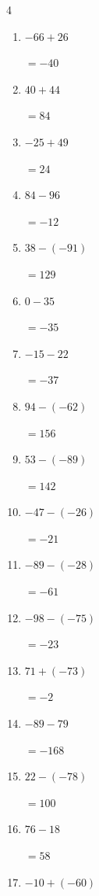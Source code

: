 \begin{multicols}{4}
\begin{enumerate}
        $=-138$

  \item $-66+26$

        $=-40$

  \item $40+44$

        $=84$

  \item $-25+49$

        $=24$

  \item $84-96$

        $=-12$

  \item $38-(-91)$

        $=129$

  \item $0-35$

        $=-35$

  \item $-15-22$

        $=-37$

  \item $94-(-62)$

        $=156$

  \item $53-(-89)$

        $=142$

  \item $-47-(-26)$

        $=-21$

  \item $-89-(-28)$

        $=-61$

  \item $-98-(-75)$

        $=-23$

\columnbreak %

  \item $71+(-73)$

        $=-2$

  \item $-89-79$

        $=-168$

  \item $22-(-78)$

        $=100$

  \item $76-18$

        $=58$

  \item $-10+(-60)$


\end{enumerate}
\end{multicols}
